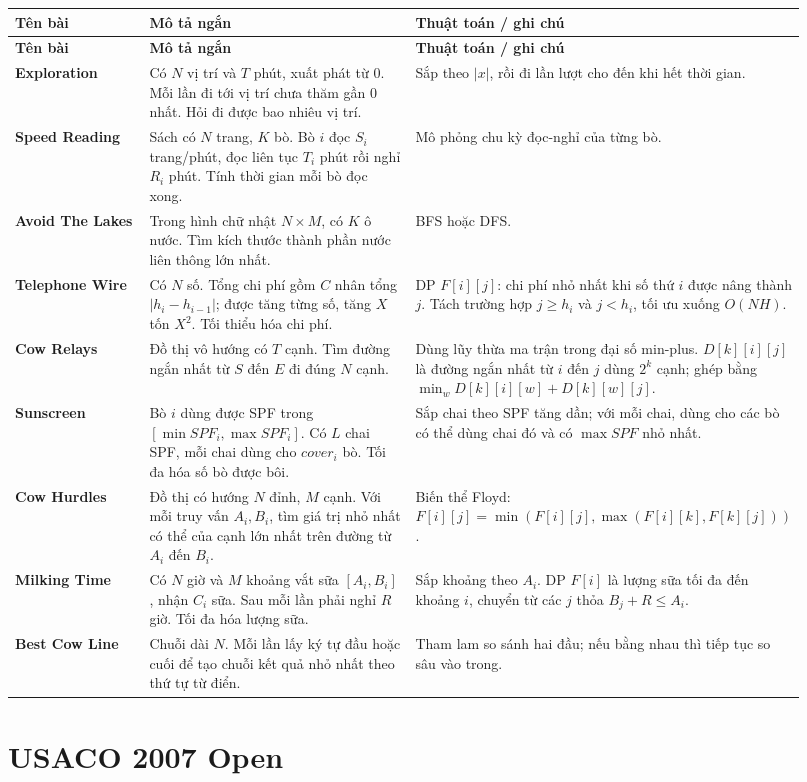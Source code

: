 \documentclass[11pt]{article}
\newenvironment{solutiontable}{%
  \small
  \setlength{\tabcolsep}{4pt}
  \renewcommand{\arraystretch}{1.14}
  \begin{longtable}{L{0.19\linewidth}L{0.39\linewidth}L{0.34\linewidth}}
  \toprule
  \textbf{Tên bài} & \textbf{Mô tả ngắn} & \textbf{Thuật toán / ghi chú}\\
  \midrule
  \endfirsthead
  \toprule
  \textbf{Tên bài} & \textbf{Mô tả ngắn} & \textbf{Thuật toán / ghi chú}\\
  \midrule
  \endhead
}{%
  \bottomrule
  \end{longtable}
  \normalsize
}
\newcommand{\problemrow}[3]{\textbf{#1} & #2 & #3\\\midrule}
\begin{document}
\begin{solutiontable}
\problemrow{Exploration}{Có \(N\) vị trí và \(T\) phút, xuất phát từ \(0\). Mỗi lần đi tới vị trí chưa thăm gần \(0\) nhất. Hỏi đi được bao nhiêu vị trí.}{Sắp theo \(|x|\), rồi đi lần lượt cho đến khi hết thời gian.}
\problemrow{Speed Reading}{Sách có \(N\) trang, \(K\) bò. Bò \(i\) đọc \(S_i\) trang/phút, đọc liên tục \(T_i\) phút rồi nghỉ \(R_i\) phút. Tính thời gian mỗi bò đọc xong.}{Mô phỏng chu kỳ đọc-nghỉ của từng bò.}
\problemrow{Avoid The Lakes}{Trong hình chữ nhật \(N\times M\), có \(K\) ô nước. Tìm kích thước thành phần nước liên thông lớn nhất.}{BFS hoặc DFS.}
\problemrow{Telephone Wire}{Có \(N\) số. Tổng chi phí gồm \(C\) nhân tổng \(|h_i-h_{i-1}|\); được tăng từng số, tăng \(X\) tốn \(X^2\). Tối thiểu hóa chi phí.}{DP \(F[i][j]\): chi phí nhỏ nhất khi số thứ \(i\) được nâng thành \(j\). Tách trường hợp \(j\ge h_i\) và \(j<h_i\), tối ưu xuống \(O(NH)\).}
\problemrow{Cow Relays}{Đồ thị vô hướng có \(T\) cạnh. Tìm đường ngắn nhất từ \(S\) đến \(E\) đi đúng \(N\) cạnh.}{Dùng lũy thừa ma trận trong đại số min-plus. \(D[k][i][j]\) là đường ngắn nhất từ \(i\) đến \(j\) dùng \(2^k\) cạnh; ghép bằng \(\min_w D[k][i][w]+D[k][w][j]\).}
\problemrow{Sunscreen}{Bò \(i\) dùng được SPF trong \([\min SPF_i,\max SPF_i]\). Có \(L\) chai SPF, mỗi chai dùng cho \(cover_i\) bò. Tối đa hóa số bò được bôi.}{Sắp chai theo SPF tăng dần; với mỗi chai, dùng cho các bò có thể dùng chai đó và có \(\max SPF\) nhỏ nhất.}
\problemrow{Cow Hurdles}{Đồ thị có hướng \(N\) đỉnh, \(M\) cạnh. Với mỗi truy vấn \(A_i,B_i\), tìm giá trị nhỏ nhất có thể của cạnh lớn nhất trên đường từ \(A_i\) đến \(B_i\).}{Biến thể Floyd: \(F[i][j]=\min(F[i][j],\max(F[i][k],F[k][j]))\).}
\problemrow{Milking Time}{Có \(N\) giờ và \(M\) khoảng vắt sữa \([A_i,B_i]\), nhận \(C_i\) sữa. Sau mỗi lần phải nghỉ \(R\) giờ. Tối đa hóa lượng sữa.}{Sắp khoảng theo \(A_i\). DP \(F[i]\) là lượng sữa tối đa đến khoảng \(i\), chuyển từ các \(j\) thỏa \(B_j+R\le A_i\).}
\problemrow{Best Cow Line}{Chuỗi dài \(N\). Mỗi lần lấy ký tự đầu hoặc cuối để tạo chuỗi kết quả nhỏ nhất theo thứ tự từ điển.}{Tham lam so sánh hai đầu; nếu bằng nhau thì tiếp tục so sâu vào trong.}
\end{solutiontable}

\section{USACO 2007 Open}
\end{document}
